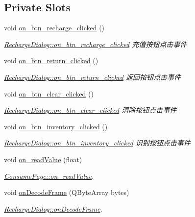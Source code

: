 \subsection*{Private Slots}
\begin{DoxyCompactItemize}
\item 
void \mbox{\hyperlink{class_recharge_dialog_a39b9307ae35c1c2e7e95d255eb2fdc73}{on\+\_\+btn\+\_\+recharge\+\_\+clicked}} ()
\begin{DoxyCompactList}\small\item\em \mbox{\hyperlink{class_recharge_dialog_a39b9307ae35c1c2e7e95d255eb2fdc73}{Recharge\+Dialog\+::on\+\_\+btn\+\_\+recharge\+\_\+clicked}} 充值按钮点击事件 \end{DoxyCompactList}\item 
void \mbox{\hyperlink{class_recharge_dialog_acead4cd4509b27f98895adc69b77c9fd}{on\+\_\+btn\+\_\+return\+\_\+clicked}} ()
\begin{DoxyCompactList}\small\item\em \mbox{\hyperlink{class_recharge_dialog_acead4cd4509b27f98895adc69b77c9fd}{Recharge\+Dialog\+::on\+\_\+btn\+\_\+return\+\_\+clicked}} 返回按钮点击事件 \end{DoxyCompactList}\item 
void \mbox{\hyperlink{class_recharge_dialog_a39a0878875f9127332f474cac43d1ed3}{on\+\_\+btn\+\_\+clear\+\_\+clicked}} ()
\begin{DoxyCompactList}\small\item\em \mbox{\hyperlink{class_recharge_dialog_a39a0878875f9127332f474cac43d1ed3}{Recharge\+Dialog\+::on\+\_\+btn\+\_\+clear\+\_\+clicked}} 清除按钮点击事件 \end{DoxyCompactList}\item 
void \mbox{\hyperlink{class_recharge_dialog_aafd9329cbf935615b90bb79350681f8b}{on\+\_\+btn\+\_\+inventory\+\_\+clicked}} ()
\begin{DoxyCompactList}\small\item\em \mbox{\hyperlink{class_recharge_dialog_aafd9329cbf935615b90bb79350681f8b}{Recharge\+Dialog\+::on\+\_\+btn\+\_\+inventory\+\_\+clicked}} 识别按钮点击事件 \end{DoxyCompactList}\item 
void \mbox{\hyperlink{class_recharge_dialog_adfce62fdba02f8a9f105b646d86957aa}{on\+\_\+read\+Value}} (float)
\begin{DoxyCompactList}\small\item\em \mbox{\hyperlink{class_consume_page_aee88a9a496e88620383622b4ab20e4c9}{Consume\+Page\+::on\+\_\+read\+Value}}. \end{DoxyCompactList}\item 
void \mbox{\hyperlink{class_recharge_dialog_ae72f6af3e5f317cecafe239fe830853c}{on\+Decode\+Frame}} (Q\+Byte\+Array bytes)
\begin{DoxyCompactList}\small\item\em \mbox{\hyperlink{class_recharge_dialog_ae72f6af3e5f317cecafe239fe830853c}{Recharge\+Dialog\+::on\+Decode\+Frame}}. \end{DoxyCompactList}\end{DoxyCompactItemize}
